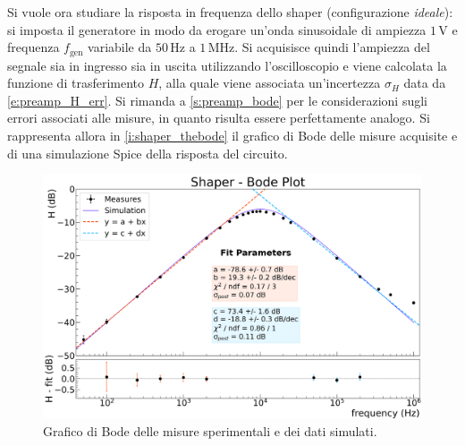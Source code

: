 \documentclass[a4paper,11pt]{article} %
\begin{document}
Si vuole ora studiare la risposta in frequenza dello shaper (configurazione \textit{ideale}): si imposta il generatore
in modo da erogare un'onda sinusoidale di ampiezza $1\,\si{\volt}$ e frequenza $f_{\text{gen}}$ variabile da
$50\,\si{\Hz}$ a $1\,\si{\MHz}$. Si acquisisce quindi l'ampiezza del segnale sia in ingresso sia in uscita utilizzando
l'oscilloscopio e viene calcolata la funzione di trasferimento $H$, alla quale viene associata un'incertezza
$\sigma_{H}$ data da \autoref{e:preamp_H_err}. Si rimanda a \autoref{s:preamp_bode} per le considerazioni sugli errori
associati alle misure, in quanto risulta essere perfettamente analogo. Si rappresenta allora in
\autoref{i:shaper_thebode} il grafico di Bode delle misure acquisite e di una simulazione Spice della risposta del
circuito. 

\begin{figure}[H] 
	\centering 
	\includegraphics[width=0.9\linewidth]{../Plots/Shaper/bode_plot.png} 
	\caption{\small Grafico di Bode delle misure sperimentali e dei dati simulati.} 
	\label{i:shaper_thebode} 
\end{figure} 
\end{document}
